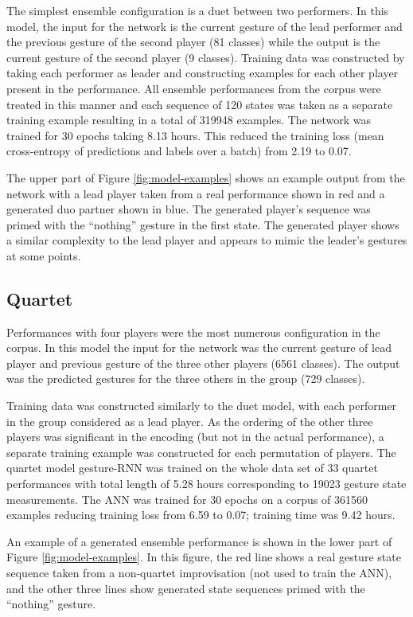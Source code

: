 \documentclass[sigchi, authorversion=true]{acmart}
\begin{document}
The simplest ensemble configuration is a duet between two performers.
In this model, the input for the network is the current gesture of the
lead performer and the previous gesture of the second player (81 classes) while the
output is the current gesture of the second player (9 classes). Training data was
constructed by taking each performer as leader and constructing
examples for each other player present in the performance. All
ensemble performances from the corpus were treated in this manner and
each sequence of 120 states was taken as a separate training example
resulting in a total of 319948 examples. The network was trained for
30 epochs taking 8.13 hours. This reduced the training loss (mean
cross-entropy of predictions and labels over a batch) from 2.19 to
0.07.

The upper part of Figure \ref{fig:model-examples} shows an example
output from the network with a lead player taken from a real
performance shown in red and a generated duo partner shown in blue.
The generated player's sequence was primed with the ``nothing''
gesture in the first state. The generated player shows a similar
complexity to the lead player and appears to mimic the leader's
gestures at some points.

\subsection{Quartet}

Performances with four players were the most numerous 
configuration in the corpus. In this model the input for the network
was the current gesture of lead player and previous gesture of the
three other players (6561 classes). The output was the predicted gestures for the
three others in the group (729 classes).

Training data was constructed similarly to the duet model, with each
performer in the group considered as a lead player. As the ordering of
the other three players was significant in the encoding (but not in
the actual performance), a separate training example was constructed
for each permutation of players. The quartet model gesture-RNN was
trained on the whole data set of 33 quartet performances with total
length of 5.28 hours corresponding to 19023 gesture state
measurements. The ANN was trained for 30 epochs on a corpus of 361560
examples reducing training loss from 6.59 to 0.07; training time was 9.42 hours.

An example of a generated ensemble performance is shown in the lower
part of Figure \ref{fig:model-examples}. In this figure, the red line
shows a real gesture state sequence taken from a non-quartet
improvisation (not used to train the ANN), and the other three lines
show generated state sequences primed with the ``nothing'' gesture.
\end{document}
